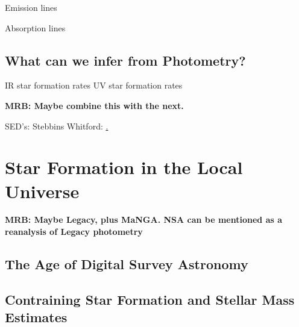 Emission lines


Absorption lines

\subsection{What can we infer from Photometry?}
IR star formation rates
UV star formation rates

{\bf MRB: Maybe combine this with the next.}



SED's: Stebbins Whitford: \href{http://adsabs.harvard.edu/abs/1968ApJ...154...21O}.

\section{Star Formation in the Local Universe}

{\bf MRB: Maybe Legacy, plus MaNGA. NSA can be mentioned
as a reanalysis of Legacy photometry}

\subsection{The Age of Digital Survey Astronomy}

\subsection{Contraining Star Formation and Stellar Mass Estimates}



